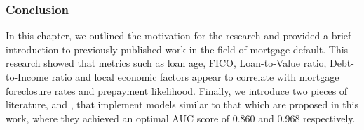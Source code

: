


        \subsubsection{Conclusion}
            In this chapter, we outlined the motivation for the research and provided a brief introduction to previously published work in the field of mortgage default. This research showed that metrics such as loan age, FICO, Loan-to-Value ratio, Debt-to-Income ratio and local economic factors appear to correlate with mortgage foreclosure rates and prepayment likelihood. Finally, we introduce two pieces of literature,  and \cite{similar_paper_deng}, that implement models similar to that which are proposed in this work, where they achieved an optimal AUC score of 0.860 and 0.968 respectively.  
            
            
    
    























            
            

            




